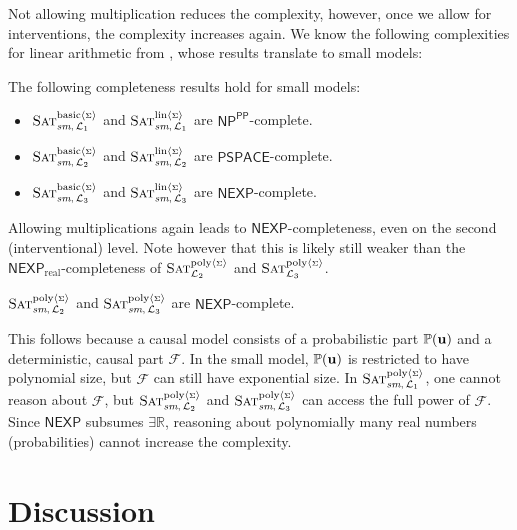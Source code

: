\documentclass[a4paper,UKenglish,cleveref, autoref, thm-restate]{lipics-v2021}
\newcommand{\IR}{\mathbb{R}}
\newcommand{\compactEquals}[1]{\let\IsInPP=1#1\let\IsInPP=\relax}
\newcommand{\PP}[1]{\mathbb{P}(\compactEquals{#1})}
\newcommand{\existsR}{\ensuremath{\mathsf{\exists\IR}}}
\newcommand{\NP}{\ensuremath{\mathsf{NP}}}
\newcommand{\NEXP}{\ensuremath{\mathsf{NEXP}}}
\newcommand{\realNEXP}{\ensuremath{\mathsf{NEXP}_{\text{real}}}}
\newcommand{\PSPACE}{\ensuremath{\mathsf{PSPACE}}}
\newcommand{\ccPP}{\ensuremath{\mathsf{PP}}}
\newcommand{\cF}{{\mathcal F}}
\newcommand{\bu}{{\bf u}}
\def\probsumname#1#2{^{\text{#1}{\langle{\scriptscriptstyle\Sigma}\rangle}}_{\text{#2}}}
\newcommand{\SATinterventpolysum}{\mbox{\sc Sat}\probsumname{poly}{${\cal L}_2$}}
\newcommand{\SATcausalpolysum}{\mbox{\sc Sat}\probsumname{poly}{${\cal L}_3$}}
\newcommand{\SATprobpolysumsm}{\mbox{\sc Sat}\probsumname{poly}{\textit{sm},\,${\cal L}_1$}}
\newcommand{\SATinterventpolysumsm}{\mbox{\sc Sat}\probsumname{poly}{\textit{sm},\,${\cal L}_2$}}
\newcommand{\SATcausalpolysumsm}{\mbox{\sc Sat}\probsumname{poly}{\textit{sm},\,${\cal L}_3$}}
\newcommand{\SATproblinsumsm}{\mbox{\sc Sat}\probsumname{lin}{\textit{sm},\,${\cal L}_1$}}
\newcommand{\SATinterventlinsumsm}{\mbox{\sc Sat}\probsumname{lin}{\textit{sm},\,${\cal L}_2$}}
\newcommand{\SATcausallinsumsm}{\mbox{\sc Sat}\probsumname{lin}{\textit{sm},\,${\cal L}_3$}}
\newcommand{\SATprobcompsumsm}{\mbox{\sc Sat}\probsumname{basic}{\textit{sm},\,${\cal L}_1$}}
\newcommand{\SATinterventcompsumsm}{\mbox{\sc Sat}\probsumname{basic}{\textit{sm},\,${\cal L}_2$}}
\newcommand{\SATcausalcompsumsm}{\mbox{\sc Sat}\probsumname{basic}{\textit{sm},\,${\cal L}_3$}}
\newenvironment{compactitem}{\begin{itemize}}{\end{itemize}}
\begin{document}
Not allowing multiplication reduces the complexity, however, once we allow for interventions, the complexity increases again. We know the following complexities for linear arithmetic from \citep{doerflerICLR2025}, whose results translate to small models:
 
\begin{lemma}
    \label{lemma:small:model:in:linear}
    The following completeness results hold for small models:
    \begin{compactitem}
        \item $\SATprobcompsumsm$ and $\SATproblinsumsm$ are $\NP^{\ccPP}$-complete.
        \item $\SATinterventcompsumsm$ and $\SATinterventlinsumsm$ are $\PSPACE$-complete.
        \item $\SATcausalcompsumsm$ and $\SATcausallinsumsm$ are $\NEXP$-complete.
    \end{compactitem}
\end{lemma}

Allowing multiplications again leads to $\NEXP$-completeness, even on the second (interventional) level.
Note however that this is likely still weaker than the $\realNEXP$-completeness 
of $\SATinterventpolysum$ and $\SATcausalpolysum$.
\begin{theorem}\label{lab:lemma:interv:counter:smconj}
	$\SATinterventpolysumsm$ and $\SATcausalpolysumsm$ are $\NEXP$-complete.
\end{theorem}


This follows because a causal model consists of a probabilistic part $\PP{\bu}$ and a deterministic, causal part $\cF$.
In the small model, $\PP{\bu}$ is restricted to have polynomial size, but $\cF$ can still have exponential size.
In $\SATprobpolysumsm$, one cannot reason about $\cF$, but $\SATinterventpolysumsm$ and $\SATcausalpolysumsm$ can access the full power of $\cF$. Since $\NEXP$ subsumes $\existsR$, reasoning about polynomially many real numbers (probabilities) cannot increase the complexity.





\section{Discussion}\label{sec:landscape}
\end{document}
